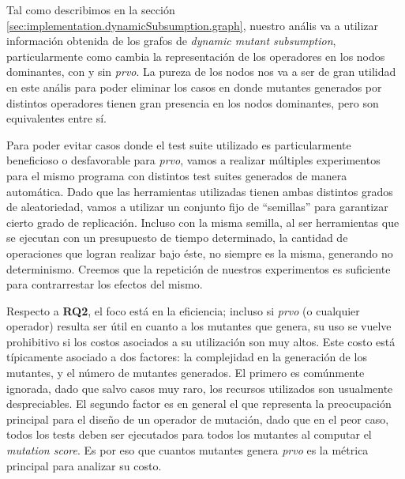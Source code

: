 Tal como describimos en la secci\'on \ref{sec:implementation.dynamicSubsumption.graph}, nuestro an\'alis va a utilizar informaci\'on obtenida de los grafos de \emph{dynamic mutant subsumption}, particularmente como cambia la representaci\'on de los operadores en los nodos dominantes, con y sin \emph{prvo}. La pureza de los nodos nos va a ser de gran utilidad en este an\'alis para poder eliminar los casos en donde mutantes generados por distintos operadores tienen gran presencia en los nodos dominantes, pero son equivalentes entre s\'i.

Para poder evitar casos donde el test suite utilizado es particularmente beneficioso o desfavorable para \emph{prvo}, vamos a realizar m\'ultiples experimentos para el mismo programa con distintos test suites generados de manera autom\'atica. Dado que las herramientas utilizadas tienen ambas distintos grados de aleatoriedad, vamos a utilizar un conjunto fijo de ``semillas'' para garantizar cierto grado de replicaci\'on. Incluso con la misma semilla, al ser herramientas que se ejecutan con un presupuesto de tiempo determinado, la cantidad de operaciones que logran realizar bajo \'este, no siempre es la misma, generando no determinismo. Creemos que la repetici\'on de nuestros experimentos es suficiente para contrarrestar los efectos del mismo.

Respecto a \textbf{RQ2}, el foco est\'a en la eficiencia; incluso si \emph{prvo} (o cualquier operador) resulta ser \'util en cuanto a los mutantes que genera, su uso se vuelve prohibitivo si los costos asociados a su utilizaci\'on son muy altos. Este costo est\'a t\'ipicamente asociado a dos factores: la complejidad en la generaci\'on de los mutantes, y el n\'umero de mutantes generados. El primero es com\'unmente ignorada, dado que salvo casos muy raro, los recursos utilizados son usualmente despreciables. El segundo factor es en general el que representa la preocupaci\'on principal para el dise\~no de un operador de mutaci\'on, dado que en el peor caso, todos los tests deben ser ejecutados para todos los mutantes al computar el \emph{mutation score}. Es por eso que cuantos mutantes genera \emph{prvo} es la m\'etrica principal para analizar su costo.


